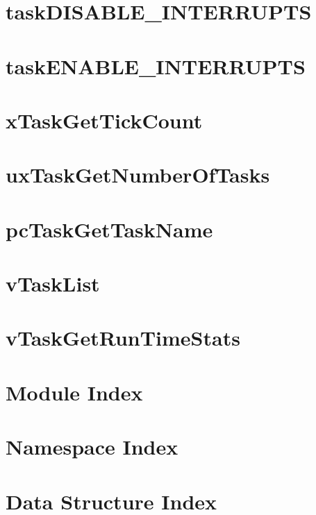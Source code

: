 \documentclass{book}
\begin{document}
\chapter{task\-D\-I\-S\-A\-B\-L\-E\-\_\-\-I\-N\-T\-E\-R\-R\-U\-P\-T\-S}
\label{taskDISABLE_INTERRUPTS}
\hypertarget{taskDISABLE_INTERRUPTS}{}

\chapter{task\-E\-N\-A\-B\-L\-E\-\_\-\-I\-N\-T\-E\-R\-R\-U\-P\-T\-S}
\label{taskENABLE_INTERRUPTS}
\hypertarget{taskENABLE_INTERRUPTS}{}

\chapter{x\-Task\-Get\-Tick\-Count}
\label{xTaskGetTickCount}
\hypertarget{xTaskGetTickCount}{}

\chapter{ux\-Task\-Get\-Number\-Of\-Tasks}
\label{uxTaskGetNumberOfTasks}
\hypertarget{uxTaskGetNumberOfTasks}{}

\chapter{pc\-Task\-Get\-Task\-Name}
\label{pcTaskGetTaskName}
\hypertarget{pcTaskGetTaskName}{}

\chapter{v\-Task\-List}
\label{vTaskList}
\hypertarget{vTaskList}{}

\chapter{v\-Task\-Get\-Run\-Time\-Stats}
\label{vTaskGetRunTimeStats}
\hypertarget{vTaskGetRunTimeStats}{}

\chapter{Module Index}

\chapter{Namespace Index}

\chapter{Data Structure Index}

\end{document}
